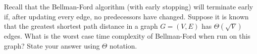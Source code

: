 \begin{prob}
    Recall that the Bellman-Ford algorithm (with early stopping) will terminate early
    if, after updating every edge, no predecessors have changed. Suppose it is
    known that the greatest shortest path distance in a graph $G = (V, E)$ has
    $\Theta(\sqrt{V})$ edges. What is the worst case time complexity of
    Bellman-Ford when run on this graph? State your answer using $\Theta$
    notation.

    \begin{soln}
    \end{soln}
\end{prob}
